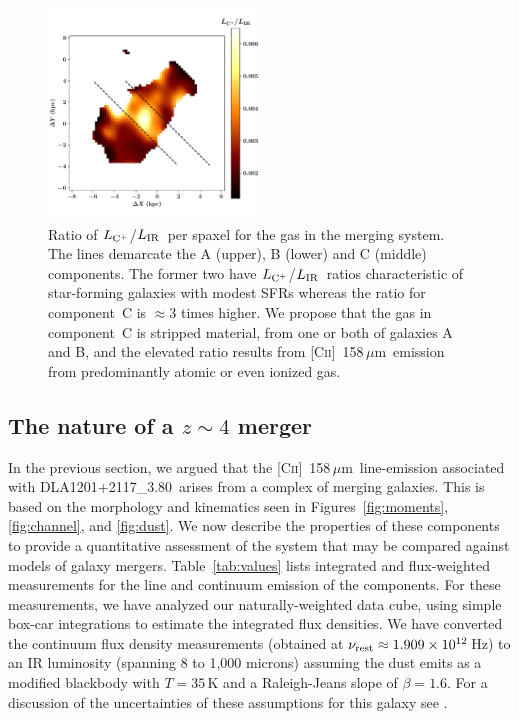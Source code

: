 \documentclass[twocolumn]{aastex62}
\newcommand{\dlaname}{DLA1201+2117\_3.80}
\newcommand{\cplus}{[\ctwo]~158\,$\mu$m}
\newcommand{\mldust}{L_{\rm IR}}  %
\newcommand{\ldust}{$\mldust$}
\newcommand{\mlcplus}{L_{\rm C^+}}   %
\newcommand{\lcplus}{$\mlcplus$}
\newcommand{\ctwo}{C\textsc{ii}}
\begin{document}
\begin{figure}
\centering
\includegraphics[width=0.5\textwidth]{fig_cplus2dust_lines.pdf}
\vspace{-0.3in}
\caption{Ratio of \lcplus/\ldust\ per spaxel for the gas in the merging system.  
The lines demarcate the A (upper), B (lower) and C (middle) components.  The former 
two have \lcplus/\ldust\ ratios characteristic of star-forming galaxies with modest 
SFRs whereas the ratio for component~C is $\approx 3$ times higher.  We propose that 
the gas in component~C is stripped material, from one or both of galaxies A and B, and 
the elevated ratio results from \cplus\ emission from predominantly atomic or even ionized gas.
}
\label{fig:ratio}
\end{figure}


\subsection{The nature of a $z \sim 4$ merger}

In the previous section, we argued that the \cplus\ line-emission associated with \dlaname\ 
arises from a complex of merging galaxies. This is based on the morphology and kinematics
seen in Figures~\ref{fig:moments}, \ref{fig:channel}, and \ref{fig:dust}.  We now describe the 
properties of these components to provide a quantitative assessment of the system that may 
be compared against models of galaxy mergers. Table~\ref{tab:values} lists integrated and
flux-weighted measurements for the line and continuum emission of the components.  For these 
measurements, we have analyzed our naturally-weighted data cube, using simple box-car integrations 
to estimate the integrated flux densities. We have converted the continuum flux density measurements
(obtained at $\nu_{\rm rest} \approx 1.909 \times 10^{12}$\,Hz) to an IR luminosity (spanning 8 to 1,000 
microns) assuming the dust emits as a modified blackbody with $T = 35$\,K and a Raleigh-Jeans slope of $\beta = 1.6$. For a discussion of the uncertainties of these assumptions for this galaxy see \citet{neeleman+17}.
\end{document}
